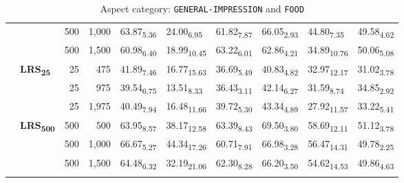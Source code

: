 \begin{table}[H]
\begin{subtable}{\linewidth}
{\begin{tabular}{llrrllllll}
 &  & 500 & 1,000 & 63.87\textsubscript{5.36} & 24.00\textsubscript{6.95} & 61.82\textsubscript{7.87} & 66.05\textsubscript{2.93} & 44.80\textsubscript{7.35} & 49.58\textsubscript{4.62} \\
 &  & 500 & 1,500 & 60.98\textsubscript{6.40} & 18.99\textsubscript{10.45} & 63.22\textsubscript{6.01} & 62.86\textsubscript{4.21} & 34.89\textsubscript{10.76} & 50.06\textsubscript{5.08} \\
\arrayrulecolor{gray}\cline{2-10}\arrayrulecolor{black}
\hline
\multirow{6}{*}{\textbf{GPT-3.5-turbo}} & \multirow{3}{*}{\textbf{LRS\textsubscript{25}}} & 25 & 475 & 41.89\textsubscript{7.46} & 16.77\textsubscript{15.63} & 36.69\textsubscript{5.49} & 40.83\textsubscript{4.82} & 32.97\textsubscript{12.17} & 31.02\textsubscript{3.78} \\
 &  & 25 & 975 & 39.54\textsubscript{6.75} & 13.51\textsubscript{8.33} & 36.43\textsubscript{3.11} & 42.14\textsubscript{6.27} & 31.59\textsubscript{8.74} & 34.85\textsubscript{2.92} \\
 &  & 25 & 1,975 & 40.49\textsubscript{7.94} & 16.48\textsubscript{11.66} & 39.72\textsubscript{5.30} & 43.34\textsubscript{4.89} & 27.92\textsubscript{11.57} & 33.22\textsubscript{5.41} \\
\arrayrulecolor{gray}\cline{2-10}\arrayrulecolor{black}
 & \multirow{3}{*}{\textbf{LRS\textsubscript{500}}} & 500 & 500 & 63.95\textsubscript{8.57} & 38.17\textsubscript{12.58} & 63.39\textsubscript{8.43} & 69.50\textsubscript{3.80} & 58.69\textsubscript{12.11} & 51.12\textsubscript{3.78} \\
 &  & 500 & 1,000 & 66.67\textsubscript{5.27} & 44.34\textsubscript{17.26} & 60.71\textsubscript{7.91} & 66.98\textsubscript{3.28} & 56.47\textsubscript{14.31} & 49.78\textsubscript{2.25} \\
 &  & 500 & 1,500 & 64.48\textsubscript{6.32} & 32.19\textsubscript{21.06} & 62.30\textsubscript{8.28} & 66.20\textsubscript{3.50} & 54.62\textsubscript{14.53} & 49.86\textsubscript{4.63} \\
\arrayrulecolor{gray}\cline{2-10}\arrayrulecolor{black}
\hline
\end{tabular}
}
\caption{Aspect category: \texttt{GENERAL-IMPRESSION} and \texttt{FOOD}}
\vspace{0.3cm}
\end{subtable}
\begin{subtable}{\linewidth}
\renewcommand{\arraystretch}{1.0}
\setlength{\tabcolsep}{0.1cm}
\centering
{}
\end{subtable}
\end{table}
